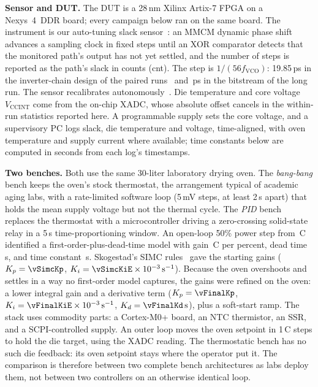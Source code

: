 \documentclass[10pt,twocolumn]{article}
\newcommand{\degC}{\,\textdegree C}
\newcommand{\unit}[1]{\,\mathrm{#1}}
\begin{document}
\textbf{Sensor and DUT.} The DUT is a 28\,nm Xilinx Artix-7 FPGA on a Nexys~4~DDR board; every campaign below ran on the same board. The instrument is our auto-tuning slack sensor~\cite{sbcci25}: an MMCM dynamic phase shift advances a sampling clock in fixed steps until an XOR comparator detects that the monitored path's output has not yet settled, and the number of steps is reported as the path's slack in counts (cnt). The step is $1/(56f_{\mathrm{VCO}})$: 19.85\,ps in the inverter-chain design of the paired runs~\cite{sbcci26} and \vPsRCA\,ps in the bitstream of the long run. The sensor recalibrates autonomously~\cite{sbcci25}. Die temperature and core voltage $V_{\mathrm{CCINT}}$ come from the on-chip XADC, whose absolute offset cancels in the within-run statistics reported here. A programmable supply sets the core voltage, and a supervisory PC logs slack, die temperature and voltage, time-aligned, with oven temperature and supply current where available; time constants below are computed in seconds from each log's timestamps.

\textbf{Two benches.} Both use the same 30-liter laboratory drying oven. The \emph{bang-bang} bench keeps the oven's stock thermostat, the arrangement typical of academic aging labs, with a rate-limited software loop (5\,mV steps, at least 2\,s apart) that holds the mean supply voltage but not the thermal cycle. The \emph{PID} bench replaces the thermostat with a microcontroller driving a zero-crossing solid-state relay in a 5\,s time-proportioning window. An open-loop 50\% power step from \vFopdtTzero\degC{} identified a first-order-plus-dead-time model with gain \vFopdtK\degC{} per percent, dead time \vFopdtTheta\,s, and time constant \vFopdtTau\,s. Skogestad's SIMC rules~\cite{simc} gave the starting gains ($K_p=\vSimcKp$, $K_i=\vSimcKiE\times10^{-3}\unit{s^{-1}}$). Because the oven overshoots and settles in a way no first-order model captures, the gains were refined on the oven: a lower integral gain and a derivative term ($K_p=\vFinalKp$, $K_i=\vFinalKiE\times10^{-3}\unit{s^{-1}}$, $K_d=\vFinalKd\unit{s}$), plus a soft-start ramp. The stack uses commodity parts: a Cortex-M0+ board, an NTC thermistor, an SSR, and a SCPI-controlled supply. An outer loop moves the oven setpoint in 1\degC{} steps to hold the die target, using the XADC reading. The thermostatic bench has no such die feedback: its oven setpoint stays where the operator put it. The comparison is therefore between two complete bench architectures as labs deploy them, not between two controllers on an otherwise identical loop.
\end{document}
